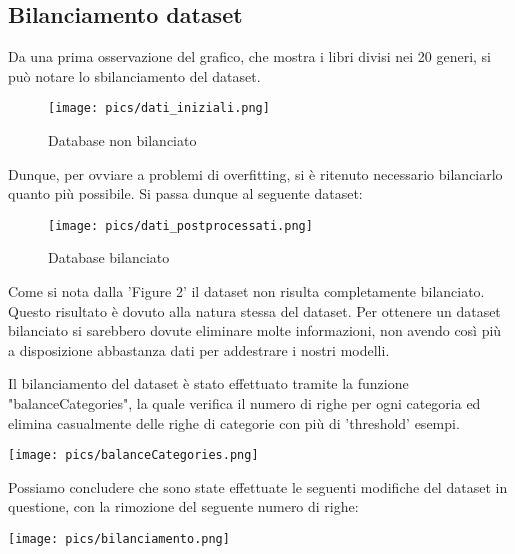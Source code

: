 \documentclass[12pt,oneside]{article}
\begin{document}
    \newpage
    \begin{enumerate}
    \subsection{Bilanciamento dataset}\label{bil}
    \begin{justify}
    Da una prima osservazione del grafico, che mostra i libri divisi nei 20 generi, si può notare lo sbilanciamento del dataset. 
    \end{justify}
    
    \begin{figure}[H]
    \texttt{[image: pics/dati\_iniziali.png]}
    \caption{Database non bilanciato}
    \end{figure}

    \hfill
    \begin{justify}
    Dunque, per ovviare a problemi di overfitting, si è ritenuto necessario bilanciarlo quanto più possibile. Si passa dunque al seguente dataset:
    \end{justify}
    
    \begin{figure}[H]
    \texttt{[image: pics/dati\_postprocessati.png]}
    \caption{Database bilanciato}
    \end{figure}
    
    \begin{justify}
    Come si nota dalla 'Figure 2' il dataset non risulta completamente bilanciato. Questo risultato è dovuto alla natura stessa del dataset. Per ottenere un dataset bilanciato si sarebbero dovute eliminare molte informazioni, non avendo così più a disposizione abbastanza dati per addestrare i nostri modelli.\\
    \end{justify}

    \newpage
    \begin{justify}
    Il bilanciamento del dataset è stato effettuato tramite la funzione "balanceCategories", la quale verifica il numero di righe per ogni categoria ed elimina casualmente delle righe di categorie con più di 'threshold' esempi.
    \end{justify}
    \texttt{[image: pics/balanceCategories.png]}
    

    \begin{minipage}[t]{0.40\textwidth}
    \vspace{30pt}
    Possiamo concludere che sono state effettuate le seguenti modifiche del dataset in questione, con la rimozione del seguente numero di righe:
    \end{minipage}
    \hfill
    \begin{minipage}[t]{0.50\textwidth}
    \vspace{20pt}
    \texttt{[image: pics/bilanciamento.png]}
    \end{minipage}
    \end{enumerate}
\end{document}
